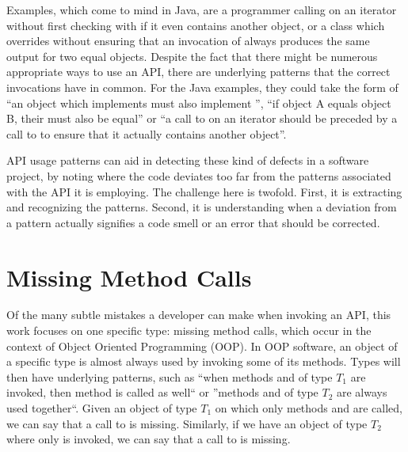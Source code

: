 Examples, which come to mind in Java, are a programmer calling  on an iterator without first checking with  if it even contains another object, or a class which overrides  without ensuring that an invocation of  always produces the same output for two equal objects.
Despite the fact that there might be numerous appropriate ways to use an API, there are underlying patterns that the correct invocations have in common.
For the Java examples, they could take the form of ``an object which implements  must also implement '', ``if object A equals object B, their  must also be equal'' or ``a call to  on an iterator should be preceded by a call to  to ensure that it actually contains another object''.

API usage patterns \cite{robillard2013automated} can aid in detecting these kind of defects in a software project, by noting where the code deviates too far from the patterns associated with the API it is employing.
The challenge here is twofold.
First, it is extracting and recognizing the patterns.
Second, it is understanding when a deviation from a pattern actually signifies a code smell or an error that should be corrected.

\section{Missing Method Calls}

Of the many subtle mistakes a developer can make when invoking an API, this work focuses on one specific type: missing method calls, which occur in the context of Object Oriented Programming (OOP).
In OOP software, an object of a specific type is almost always used by invoking some of its methods.
Types will then have underlying patterns, such as ``when methods  and  of type $T_1$ are invoked, then method  is called as well`` or ''methods  and  of type $T_2$ are always used together``.
Given an object of type $T_1$ on which only methods  and  are called, we can say that a call to  is missing.
Similarly, if we have an object of type $T_2$ where only  is invoked, we can say that a call to  is missing.

